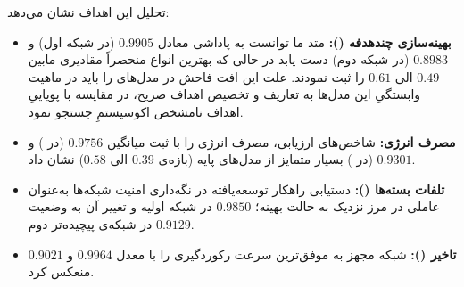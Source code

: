 \documentclass[oneside,openany,phd]{TMU-Thesis}
\begin{document}
\begin{table}[h!]
\centering
\caption{نتایج اهداف کمینه‌سازی در }
\label{tab:min_goals_v1_1}
\end{table}

تحلیل این اهداف نشان می‌دهد:
\begin{itemize}
  \item \textbf{بهینه‌سازی چندهدفه ():} متد ما توانست به پاداشی معادل $0.9905$ (در شبکه اول) و $0.8983$ (در شبکه دوم) دست یابد در حالی که بهترین انواع  منحصراً مقادیری مابین $0.49$ الی $0.61$ را ثبت نمودند. علت این افت فاحش در مدل‌های  را باید در ماهیت وابستگیِ این مدل‌ها به تعاریف و تخصیص اهداف صریح، در مقایسه با پویاییِ اهداف نامشخص اکوسیستمِ  جستجو نمود.
  \item \textbf{مصرف انرژی:} شاخص‌های ارزیابی، مصرف انرژی  را با ثبت میانگین $0.9756$ (در ) و $0.9301$ (در ) بسیار متمایز از مدل‌های پایه (بازه‌‌ی $0.39$ الی $0.58$) نشان داد.
  \item \textbf{تلفات بسته‌ها ():} دستیابی راهکار توسعه‌یافته در نگه‌داری امنیت شبکه‌ها به‌عنوان عاملی در مرز نزدیک به حالت بهینه؛ $0.9850$ در شبکه اولیه و تغییر آن به وضعیت $0.9129$ در شبکه‌ی پیچیده‌تر دوم.
  \item \textbf{تاخیر ():} شبکه مجهز به  موفق‌ترین سرعت رکوردگیری را با معدل $0.9964$ و $0.9021$ منعکس کرد.
\end{itemize}
\end{document}
